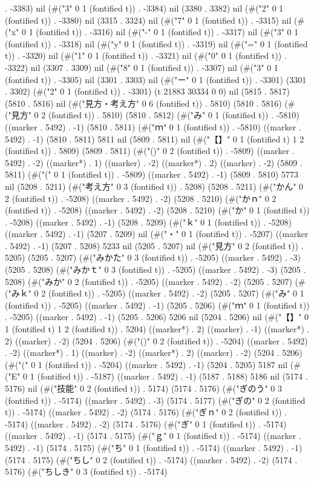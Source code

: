 . -3383) nil (#("3" 0 1 (fontified t)) . -3384) nil (3380 . 3382) nil (#("2" 0 1 (fontified t)) . -3380) nil (3315 . 3324) nil (#("7" 0 1 (fontified t)) . -3315) nil (#("x" 0 1 (fontified t)) . -3316) nil (#("-" 0 1 (fontified t)) . -3317) nil (#("3" 0 1 (fontified t)) . -3318) nil (#("y" 0 1 (fontified t)) . -3319) nil (#("=" 0 1 (fontified t)) . -3320) nil (#("1" 0 1 (fontified t)) . -3321) nil (#("0" 0 1 (fontified t)) . -3322) nil (3307 . 3309) nil (#("8" 0 1 (fontified t)) . -3307) nil (#("3" 0 1 (fontified t)) . -3305) nil (3301 . 3303) nil (#("ー" 0 1 (fontified t)) . -3301) (3301 . 3302) (#("2" 0 1 (fontified t)) . -3301) (t 21883 30334 0 0) nil (5815 . 5817) (5810 . 5816) nil (#("見方・考え方" 0 6 (fontified t)) . 5810) (5810 . 5816) (#("見方" 0 2 (fontified t)) . 5810) (5810 . 5812) (#("み" 0 1 (fontified t)) . -5810) ((marker . 5492) . -1) (5810 . 5811) (#("ｍ" 0 1 (fontified t)) . -5810) ((marker . 5492) . -1) (5810 . 5811) 5811 nil (5809 . 5811) nil (#("【】" 0 1 (fontified t) 1 2 (fontified t)) . 5809) (5809 . 5811) (#("()" 0 2 (fontified t)) . -5809) ((marker . 5492) . -2) ((marker*) . 1) ((marker) . -2) ((marker*) . 2) ((marker) . -2) (5809 . 5811) (#("(" 0 1 (fontified t)) . -5809) ((marker . 5492) . -1) (5809 . 5810) 5773 nil (5208 . 5211) (#("考え方" 0 3 (fontified t)) . 5208) (5208 . 5211) (#("かん" 0 2 (fontified t)) . -5208) ((marker . 5492) . -2) (5208 . 5210) (#("かｎ" 0 2 (fontified t)) . -5208) ((marker . 5492) . -2) (5208 . 5210) (#("か" 0 1 (fontified t)) . -5208) ((marker . 5492) . -1) (5208 . 5209) (#("ｋ" 0 1 (fontified t)) . -5208) ((marker . 5492) . -1) (5207 . 5209) nil (#("・" 0 1 (fontified t)) . -5207) ((marker . 5492) . -1) (5207 . 5208) 5233 nil (5205 . 5207) nil (#("見方" 0 2 (fontified t)) . 5205) (5205 . 5207) (#("みかた" 0 3 (fontified t)) . -5205) ((marker . 5492) . -3) (5205 . 5208) (#("みかｔ" 0 3 (fontified t)) . -5205) ((marker . 5492) . -3) (5205 . 5208) (#("みか" 0 2 (fontified t)) . -5205) ((marker . 5492) . -2) (5205 . 5207) (#("みｋ" 0 2 (fontified t)) . -5205) ((marker . 5492) . -2) (5205 . 5207) (#("み" 0 1 (fontified t)) . -5205) ((marker . 5492) . -1) (5205 . 5206) (#("ｍ" 0 1 (fontified t)) . -5205) ((marker . 5492) . -1) (5205 . 5206) 5206 nil (5204 . 5206) nil (#("【】" 0 1 (fontified t) 1 2 (fontified t)) . 5204) ((marker*) . 2) ((marker) . -1) ((marker*) . 2) ((marker) . -2) (5204 . 5206) (#("()" 0 2 (fontified t)) . -5204) ((marker . 5492) . -2) ((marker*) . 1) ((marker) . -2) ((marker*) . 2) ((marker) . -2) (5204 . 5206) (#("(" 0 1 (fontified t)) . -5204) ((marker . 5492) . -1) (5204 . 5205) 5187 nil (#("E" 0 1 (fontified t)) . -5187) ((marker . 5492) . -1) (5187 . 5188) 5186 nil (5174 . 5176) nil (#("技能" 0 2 (fontified t)) . 5174) (5174 . 5176) (#("ぎのう" 0 3 (fontified t)) . -5174) ((marker . 5492) . -3) (5174 . 5177) (#("ぎの" 0 2 (fontified t)) . -5174) ((marker . 5492) . -2) (5174 . 5176) (#("ぎｎ" 0 2 (fontified t)) . -5174) ((marker . 5492) . -2) (5174 . 5176) (#("ぎ" 0 1 (fontified t)) . -5174) ((marker . 5492) . -1) (5174 . 5175) (#("ｇ" 0 1 (fontified t)) . -5174) ((marker . 5492) . -1) (5174 . 5175) (#("ち" 0 1 (fontified t)) . -5174) ((marker . 5492) . -1) (5174 . 5175) (#("ちし" 0 2 (fontified t)) . -5174) ((marker . 5492) . -2) (5174 . 5176) (#("ちしき" 0 3 (fontified t)) . -5174) 